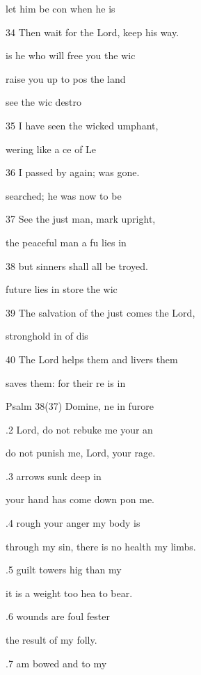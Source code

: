  let him be con when he is  

34 Then wait for the Lord, keep  his way. 

 is he who will free you  the wic 

raise you up to pos the land 

 see the wic destro 

35 I have seen the wicked umphant, 

wering like a ce of Le 

36 I passed by again;  was gone. 

 searched; he was now to be  

37 See the just man, mark  upright, 

 the peaceful man a fu lies in  

38 but sinners shall all be troyed. 

 future lies in store  the wic 

39 The salvation of the just comes  the Lord, 

 stronghold in  of dis 

40 The Lord helps them and livers them 

 saves them: for their re is in  

Psalm 38(37) Domine, ne in furore 


.2  Lord, do not rebuke me  your an 

do not punish me, Lord,  your rage. 

.3  arrows  sunk deep in  

your hand has come down pon me. 

.4 rough your anger  my body is  

through my sin, there is no health  my limbs. 

.5  guilt towers hig than my  

it is a weight too hea to bear. 

.6  wounds are foul  fester 

the result of my  folly. 

.7  am bowed and  to my  

